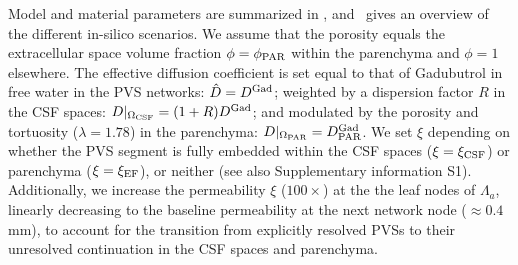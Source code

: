 \documentclass[fleqn,10pt]{wlscirep}
\begin{document}
Model and material parameters are summarized in ,
and~ gives an overview of the different in-silico
scenarios. We assume that the porosity equals the extracellular space
volume fraction $\phi = \phi_{\rm PAR}$ within the parenchyma and
$\phi = 1$ elsewhere. The effective diffusion coefficient is set equal
to that of Gadubutrol in free water in the PVS networks: $\hat{D} =
D^{\rm Gad}$; weighted by a dispersion factor $R$ in the CSF spaces:
$D|_{\Omega_{\rm CSF}} = ( 1 + R) D^{\rm Gad}$; and modulated by the
porosity and tortuosity ($\lambda = 1.78$) in the parenchyma:
$D|_{\Omega_{\rm PAR}} = D^{\rm Gad}_{\rm PAR}$. We set $\xi$
depending on whether the PVS segment is fully embedded within the CSF
spaces ($\xi = \xi_{\rm CSF}$) or parenchyma ($\xi = \xi_{\rm EF}$),
or neither (see also Supplementary information S1). Additionally, we
increase the permeability $\xi$ ($100\times$) at the the leaf nodes of
$\Lambda_a$, linearly decreasing to the baseline permeability at the
next network node ($\approx0.4\,$mm), to account for the transition
from explicitly resolved PVSs to their unresolved continuation in the
CSF spaces and parenchyma.
\end{document}
